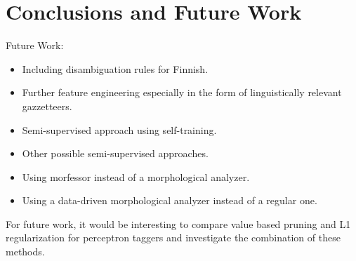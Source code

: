 \chapter{Conclusions and Future Work}
\label{chapter:conclusions}
Future Work:
\begin{itemize}
\item Including disambiguation rules for Finnish.
\item Further feature engineering especially in the form of
  linguistically relevant gazzetteers.
\item Semi-supervised approach using self-training.
\item Other possible semi-supervised approaches.
\item Using morfessor instead of a morphological analyzer.
\item Using a data-driven morphological analyzer instead of a regular
  one.
\end{itemize}

For future work, it would be interesting to compare value based
pruning and L1 regularization for perceptron taggers and investigate
the combination of these methods.
